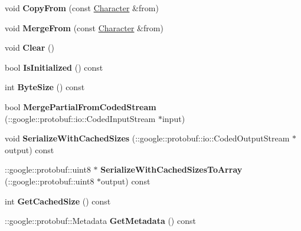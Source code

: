 \begin{DoxyCompactItemize}
\item 
\hypertarget{classproto_1_1_character_add0afd0f841d005acea8326ca2028d90}{}void {\bfseries Copy\+From} (const \hyperlink{classproto_1_1_character}{Character} \&from)\label{classproto_1_1_character_add0afd0f841d005acea8326ca2028d90}

\item 
\hypertarget{classproto_1_1_character_adcf70ea964c51f2608063282baeaa607}{}void {\bfseries Merge\+From} (const \hyperlink{classproto_1_1_character}{Character} \&from)\label{classproto_1_1_character_adcf70ea964c51f2608063282baeaa607}

\item 
\hypertarget{classproto_1_1_character_a42a81f720f0dc1c2e5f0ac1c03ce3251}{}void {\bfseries Clear} ()\label{classproto_1_1_character_a42a81f720f0dc1c2e5f0ac1c03ce3251}

\item 
\hypertarget{classproto_1_1_character_a99242fb29ccace1bd0e21f3a79c954fb}{}bool {\bfseries Is\+Initialized} () const \label{classproto_1_1_character_a99242fb29ccace1bd0e21f3a79c954fb}

\item 
\hypertarget{classproto_1_1_character_af8c367cdffe969e07ad8917b5a107545}{}int {\bfseries Byte\+Size} () const \label{classproto_1_1_character_af8c367cdffe969e07ad8917b5a107545}

\item 
\hypertarget{classproto_1_1_character_a9a96e8b83784508722e34b21172c7c57}{}bool {\bfseries Merge\+Partial\+From\+Coded\+Stream} (\+::google\+::protobuf\+::io\+::\+Coded\+Input\+Stream $\ast$input)\label{classproto_1_1_character_a9a96e8b83784508722e34b21172c7c57}

\item 
\hypertarget{classproto_1_1_character_a922061bd15e72f5289a3d08f0fee7002}{}void {\bfseries Serialize\+With\+Cached\+Sizes} (\+::google\+::protobuf\+::io\+::\+Coded\+Output\+Stream $\ast$output) const \label{classproto_1_1_character_a922061bd15e72f5289a3d08f0fee7002}

\item 
\hypertarget{classproto_1_1_character_a0d5473252d5df1e2093474324c05f1e3}{}\+::google\+::protobuf\+::uint8 $\ast$ {\bfseries Serialize\+With\+Cached\+Sizes\+To\+Array} (\+::google\+::protobuf\+::uint8 $\ast$output) const \label{classproto_1_1_character_a0d5473252d5df1e2093474324c05f1e3}

\item 
\hypertarget{classproto_1_1_character_a86d98fbf393ee54aa17389a9dc1bf282}{}int {\bfseries Get\+Cached\+Size} () const \label{classproto_1_1_character_a86d98fbf393ee54aa17389a9dc1bf282}

\item 
\hypertarget{classproto_1_1_character_a131cbcdb689033b8696fce65d0b890c0}{}\+::google\+::protobuf\+::\+Metadata {\bfseries Get\+Metadata} () const \label{classproto_1_1_character_a131cbcdb689033b8696fce65d0b890c0}

\end{DoxyCompactItemize}
